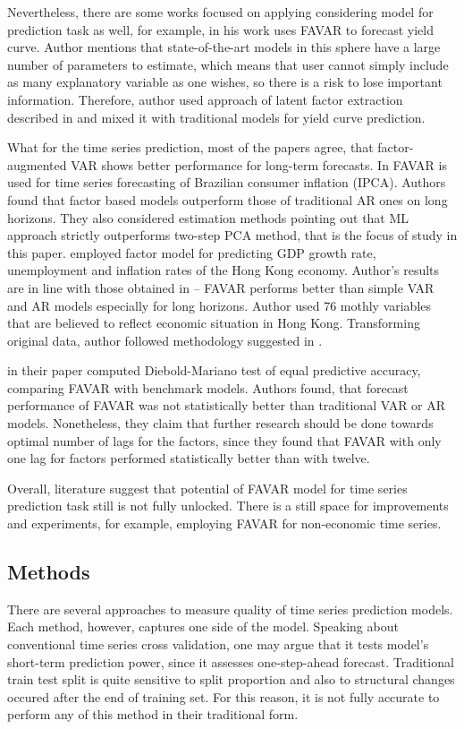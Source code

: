 \documentclass[a4paper, 14pt]{article}
\begin{document}
Nevertheless, there are some works focused on applying considering model for prediction task as well, for example,  \cite{monch2008forecasting} in his work uses FAVAR to forecast yield curve. Author mentions that state-of-the-art models in this sphere have a large number of parameters to estimate, which means that user cannot simply include as many explanatory variable as one wishes, so there is a risk to lose important information. Therefore, author used approach of latent factor extraction described in \cite{bernanke2005measuring} and mixed it with traditional models for yield curve prediction. 

What for the time series prediction, most of the papers agree, that factor-augmented VAR shows better performance for long-term forecasts. In \cite{figueiredo2013forecasting} FAVAR is used for time series forecasting of Brazilian consumer inflation (IPCA). Authors found that factor based models outperform those of traditional AR ones on long horizons. They also considered estimation methods pointing out that ML approach strictly outperforms two-step PCA method, that is the focus of study in this paper. \cite{pang2010forecasting} employed factor model for predicting GDP growth rate, unemployment and inflation rates of the Hong Kong economy. Author's results are in line with those obtained in \cite{figueiredo2013forecasting} -- FAVAR performs better than simple VAR and AR models especially for long horizons. Author used 76 mothly variables that are believed to reflect economic situation in Hong Kong. Transforming original data, author followed methodology suggested in \cite{stock2005implications}.

\cite{berggren2016can} in their paper computed Diebold-Mariano test of equal predictive accuracy, comparing FAVAR with benchmark models. Authors found, that forecast performance of FAVAR was not statistically better than traditional VAR or AR models. Nonetheless, they claim that further research should be done towards optimal number of lags for the factors, since they found that FAVAR with only one lag for factors performed statistically better than with twelve.  

Overall, literature suggest that potential of FAVAR model for time series prediction task still is not fully unlocked. There is a still space for improvements and experiments, for example, employing FAVAR for non-economic time series.

\subsection*{Methods}
There are several approaches to measure quality of time series prediction models. Each method, however, captures one side of the model. Speaking about conventional time series cross validation, one may argue that it tests model's short-term prediction power, since it assesses one-step-ahead forecast. Traditional train test split is quite sensitive to split proportion and also to structural changes occured after the end of training set. For this reason, it is not fully accurate to perform any of this method in their traditional form. 
\end{document}
